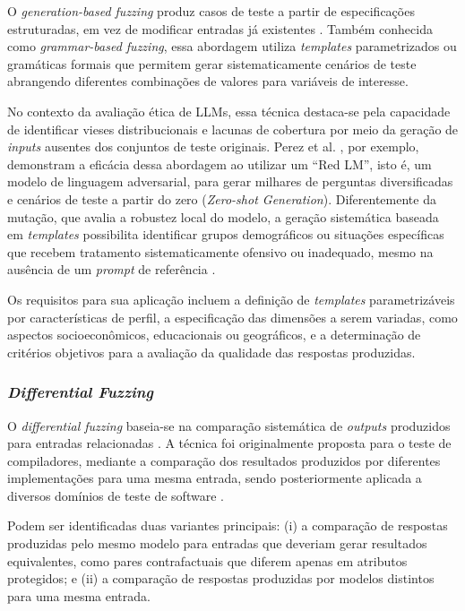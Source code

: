 O \textit{generation-based fuzzing} produz casos de teste a partir de especificações estruturadas, em vez de modificar entradas já existentes \cite{GodefroidGrammar2008, Wang2017}. Também conhecida como \textit{grammar-based fuzzing}, essa abordagem utiliza \textit{templates} parametrizados ou gramáticas formais que permitem gerar sistematicamente cenários de teste abrangendo diferentes combinações de valores para variáveis de interesse.

No contexto da avaliação ética de LLMs, essa técnica destaca-se pela capacidade de identificar vieses distribucionais e lacunas de cobertura por meio da geração de \textit{inputs} ausentes dos conjuntos de teste originais. Perez et al. \cite{Perez2022}, por exemplo, demonstram a eficácia dessa abordagem ao utilizar um ``Red LM'', isto é, um modelo de linguagem adversarial, para gerar milhares de perguntas diversificadas e cenários de teste a partir do zero (\textit{Zero-shot Generation}). Diferentemente da mutação, que avalia a robustez local do modelo, a geração sistemática baseada em \textit{templates} possibilita identificar grupos demográficos ou situações específicas que recebem tratamento sistematicamente ofensivo ou inadequado, mesmo na ausência de um \textit{prompt} de referência \cite{Perez2022, Reddy2025}.

Os requisitos para sua aplicação incluem a definição de \textit{templates} parametrizáveis por características de perfil, a especificação das dimensões a serem variadas, como aspectos socioeconômicos, educacionais ou geográficos, e a determinação de critérios objetivos para a avaliação da qualidade das respostas produzidas.

\subsubsection{\textit{Differential Fuzzing}}
\label{sec:differential}

O \textit{differential fuzzing} baseia-se na comparação sistemática de \textit{outputs} produzidos para entradas relacionadas \cite{McKeeman1998}. A técnica foi originalmente proposta para o teste de compiladores, mediante a comparação dos resultados produzidos por diferentes implementações para uma mesma entrada, sendo posteriormente aplicada a diversos domínios de teste de software \cite{Chen2016}.

Podem ser identificadas duas variantes principais: (i) a comparação de respostas produzidas pelo mesmo modelo para entradas que deveriam gerar resultados equivalentes, como pares contrafactuais que diferem apenas em atributos protegidos; e (ii) a comparação de respostas produzidas por modelos distintos para uma mesma entrada.

